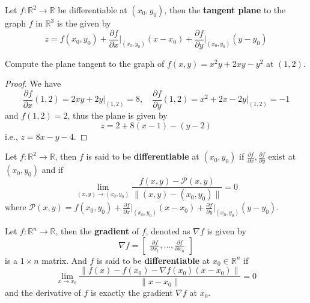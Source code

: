 \documentclass[openany]{book}
\newcommand{\R}{\mathbb{R}}
\begin{document}
\begin{defn}
    Let $f:\R^2\to\R$ be differentiable at $(x_0,y_0)$, then the \textbf{tangent plane} to the graph $f$ in $\R^3$ is the given by 
    \begin{equation*}
        z=f(x_0,y_0)+\frac{\partial f}{\partial x}\bigg\vert_{(x_0,y_0)}(x-x_0)+\frac{\partial f}{\partial y}\bigg\vert_{(x_0,y_0)}(y-y_0)
    \end{equation*}
\end{defn}

\begin{prob}
    Compute the plane tangent to the graph of $f(x,y)=x^2y+2xy-y^2$ at $(1,2)$.
\end{prob}
\begin{proof}
    We have 
    \begin{equation*}
        \frac{\partial f}{\partial x}(1,2)=2xy+2y\vert_{(1,2)}=8, \quad \frac{\partial f}{\partial y}(1,2)=x^2+2x-2y\vert_{(1,2)}=-1
    \end{equation*}
    and $f(1,2)=2$, thus the plane is given by
    \begin{equation*}
        z=2+8(x-1)-(y-2)
    \end{equation*}
    i.e., $z=8x-y-4$.
\end{proof}

\begin{defn}
    Let $f:\R^2\to\R$, then $f$ is said to be \textbf{differentiable} at $(x_0,y_0)$ if $\frac{\partial f}{\partial x}, \frac{\partial f}{\partial y}$ exist at $(x_0,y_0)$ and if 
    \begin{equation*}
        \lim_{(x,y)\to(x_0,y_0)}\frac{f(x,y)-\mathcal{P}(x,y)}{\|(x,y)-(x_0,y_0)\|}=0
    \end{equation*}
    where $\mathcal{P}(x,y)=f(x_0,y_0)+\frac{\partial f}{\partial x}\bigg\vert_{(x_0,y_0)}(x-x_0)+\frac{\partial f}{\partial y}\bigg\vert_{(x_0,y_0)}(y-y_0)$.
\end{defn}


\begin{defn}
    Let $f:\R^n\to\R$, then the \textbf{gradient} of $f$, denoted as $\nabla f$ is given by 
    \begin{equation*}
        \nabla f=\begin{bmatrix}
            \frac{\partial f}{\partial x_1}, \dots, \frac{\partial f}{\partial x_n}
        \end{bmatrix}
    \end{equation*}
    is a $1\times n$ matrix. And $f$ is said to be \textbf{differentiable} at $x_0\in\R^n$ if 
    \begin{equation*}
        \lim_{x\to x_0}\frac{\|f(x)-f(x_0)-\nabla f(x_0)(x-x_0)\|}{\|x-x_0\|}=0
    \end{equation*}
    and the derivative of $f$ is exactly the gradient $\nabla f$ at $x_0$.
\end{defn}
\end{document}

